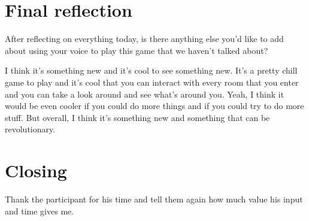 \section{Final reflection}

\begin{QandA}
   \item After reflecting on everything today, is there anything else you’d like to add about using your voice to play this game that we haven't talked about?

         \begin{answered}
            I think it's something new and it's cool to see something new.
            It's a pretty chill game to play and it's cool that you can interact with every room that you enter and you can take a look around and see what's around you.
            Yeah, I think it would be even cooler if you could do more things and if you could try to do more stuff.
            But overall, I think it's something new and something that can be revolutionary.
          
         \end{answered}
\end{QandA}

\section{Closing}
Thank the participant for his time and tell them again how much value his input and time gives me.






